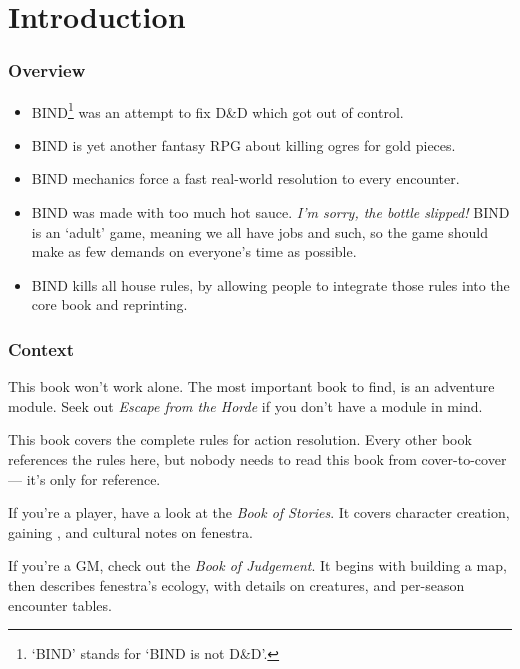 \chapter*{Introduction}

\begin{multicols}{2}

\subsection*{Overview}

\begin{itemize}
  \item
  BIND\footnote{`BIND' stands for `BIND is not D\&D'.} was an attempt to fix D\&D which got out of control.
  \item
  BIND is yet another fantasy RPG about killing ogres for gold pieces.
  \item
  BIND mechanics force a fast real-world resolution to every encounter.
  \item
  \ifnum{}
    BIND was made with too much hot sauce.
    \emph{I'm sorry, the bottle slipped!}
  \else
  BIND is an `adult' game, meaning we all have jobs and such, so the game should make as few demands on everyone's time as possible.
  \fi
  \item
  BIND kills all house rules, by allowing people to integrate those rules into the core book and reprinting.
\end{itemize}

\subsection*{Context}

This book won't work alone.
The most important book to find, is an adventure module.
Seek out \textit{Escape from the Horde} if you don't have a module in mind.

This book covers the complete rules for action resolution.
Every other book references the rules here, but nobody needs to read this book from cover-to-cover --- it's only for reference.

If you're a player, have a look at the \textit{Book of Stories}.
It covers character creation, gaining , and cultural notes on \gls{fenestra}.

If you're a GM, check out the \textit{Book of Judgement}.
It begins with building a map, then describes \gls{fenestra}'s ecology, with details on creatures, and per-season encounter tables.


\end{multicols}
